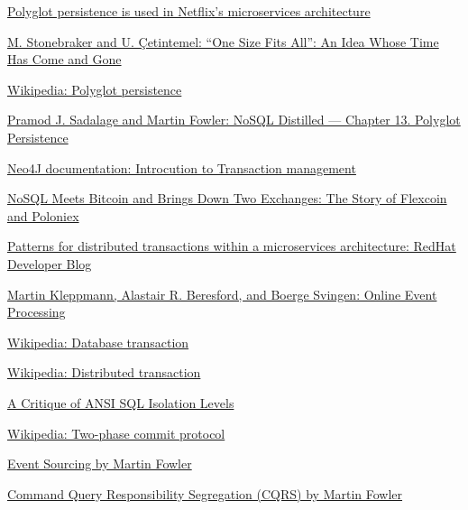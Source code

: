 \documentclass[12pt]{article}
\begin{document}
\begin{thebibliography}{9}

\href{https://www.infoq.com/articles/polyglot-persistence-microservices/}{Polyglot persistence is used in Netflix's microservices architecture}

\href{http://cs.brown.edu/research/db/publications/fits_all.pdf}{M. Stonebraker and U. Çetintemel: ``One Size Fits All'': An Idea Whose Time Has Come and Gone }

\href{https://en.wikipedia.org/wiki/Polyglot_persistence}{Wikipedia: Polyglot persistence}

\href{https://martinfowler.com/books/nosql.html}{Pramod J. Sadalage and Martin Fowler: NoSQL Distilled --- Chapter 13. Polyglot Persistence}

\href{https://neo4j.com/docs/java-reference/current/transaction-management/introduction/}{Neo4J documentation: Introcution to Transaction management}

\href{http://hackingdistributed.com/2014/04/06/another-one-bites-the-dust-flexcoin/}{NoSQL Meets Bitcoin and Brings Down Two Exchanges: The Story of Flexcoin and Poloniex}

\href{https://developers.redhat.com/blog/2018/10/01/patterns-for-distributed-transactions-within-a-microservices-architecture/}{Patterns for distributed transactions within a microservices architecture: RedHat Developer Blog}

\href{https://queue.acm.org/detail.cfm?id=3321612}{Martin Kleppmann, Alastair R. Beresford, and Boerge Svingen: Online Event Processing}

\href{https://en.wikipedia.org/wiki/Database_transaction}{Wikipedia: Database transaction}

\href{https://en.wikipedia.org/wiki/Distributed_transaction}{Wikipedia: Distributed transaction}

\href{https://www.microsoft.com/en-us/research/wp-content/uploads/2016/02/tr-95-51.pdf}{A Critique of ANSI SQL Isolation Levels}

\href{https://en.wikipedia.org/wiki/Two-phase_commit_protocol}{Wikipedia: Two-phase commit protocol}

\href{https://martinfowler.com/eaaDev/EventSourcing.html}{Event Sourcing by Martin Fowler}

\href{https://martinfowler.com/bliki/CQRS.html}{Command Query Responsibility Segregation (CQRS) by Martin Fowler}

\end{thebibliography}
\end{document}

